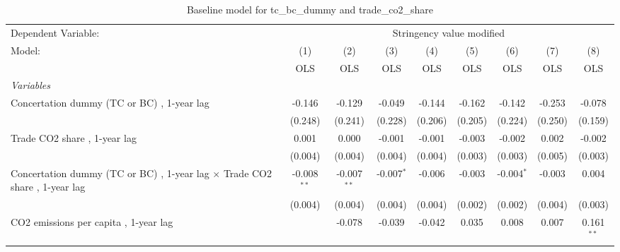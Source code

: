 
\begin{table}[htbp]
   \caption{Baseline model for tc\_bc\_dummy and trade\_co2\_share}
   \centering
   \begin{tabular}{lcccccccc}
      \toprule
      Dependent Variable: & \multicolumn{8}{c}{Stringency value modified}\\
      Model:                                                                            & (1)           & (2)           & (3)          & (4)         & (5)     & (6)          & (7)         & (8)\\  
                                                                                        &  OLS          & OLS           & OLS          & OLS         & OLS     & OLS          & OLS         & OLS\\  
      \midrule
      \emph{Variables}\\
      Concertation dummy (TC or BC) , 1-year lag                                        & -0.146        & -0.129        & -0.049       & -0.144      & -0.162  & -0.142       & -0.253      & -0.078\\   
                                                                                        & (0.248)       & (0.241)       & (0.228)      & (0.206)     & (0.205) & (0.224)      & (0.250)     & (0.159)\\   
      Trade CO2 share , 1-year lag                                                      & 0.001         & 0.000         & -0.001       & -0.001      & -0.003  & -0.002       & 0.002       & -0.002\\   
                                                                                        & (0.004)       & (0.004)       & (0.004)      & (0.004)     & (0.003) & (0.003)      & (0.005)     & (0.003)\\   
      Concertation dummy (TC or BC) , 1-year lag $\times$ Trade CO2 share , 1-year lag  & -0.008$^{**}$ & -0.007$^{**}$ & -0.007$^{*}$ & -0.006      & -0.003  & -0.004$^{*}$ & -0.003      & 0.004\\   
                                                                                        & (0.004)       & (0.004)       & (0.004)      & (0.004)     & (0.002) & (0.002)      & (0.004)     & (0.003)\\   
      CO2 emissions per capita , 1-year lag                                             &               & -0.078        & -0.039       & -0.042      & 0.035   & 0.008        & 0.007       & 0.161$^{**}$\\   

\end{tabular}
\end{table}

